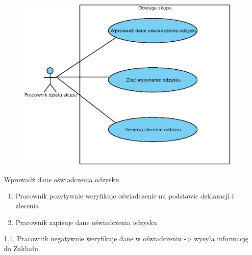 	\begin{figure}[H]
		\centering
		\includegraphics[width=.8\textwidth]{img/UC/skup.eps}
	\end{figure}

	\begin{usecase}{Wprowadź dane oświadczenia odzysku}
	\author{Dawid Suder} 
	\maketitle
\begin{scenario} 
		\begin{enumerate}
			\item Pracownik pozytywnie weryfikuje oświadczenie na podstawie deklaracji i zlecenia
			\item Pracownik zapisuje dane oświadczenia odzysku
		\end{enumerate}
	\end{scenario}
\begin{extensions}
			1.1. Pracownik negatywnie weryfikuje dane w oświadczeniu -> wysyła informację do Zakładu
	\end{extensions}
\end{usecase}


